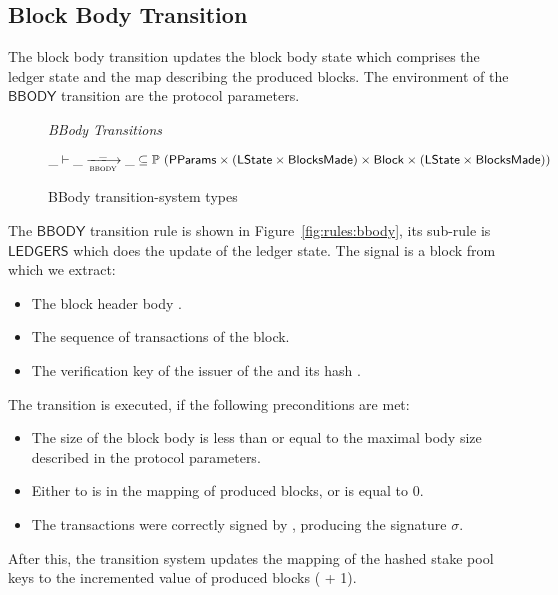 \subsection{Block Body Transition}
\label{sec:block-body-trans}

The block body transition updates the block body state which comprises the
ledger state and the map describing the produced blocks. The environment of the
$\mathsf{BBODY}$ transition are the protocol parameters.

\begin{figure}
  \emph{BBody Transitions}

  \begin{equation*}
    \_ \vdash \var{\_} \trans{bbody}{\_} \var{\_} \subseteq
    \powerset (\PParams \times (\LState\times\BlocksMade)
    \times \Block \times (\LState\times\BlocksMade))
  \end{equation*}
  \caption{BBody transition-system types}
  \label{fig:ts-types:bbody}
\end{figure}

The $\mathsf{BBODY}$ transition rule is shown in Figure~\ref{fig:rules:bbody},
its sub-rule is $\mathsf{LEDGERS}$ which does the update of the ledger
state. The signal is a block from which we extract:

\begin{itemize}
\item The block header body .
\item The sequence of transactions  of the block.
\item The verification key  of the issuer of the  and its
  hash .
\end{itemize}

The transition is executed, if the following preconditions are met:

\begin{itemize}
\item The size of the block body is less than or equal to the maximal body size
  described in the protocol parameters.
\item Either  to  is in the mapping of produced blocks, or
   is equal to 0.
\item The transactions  were correctly signed by , producing
  the signature $\sigma$.
\end{itemize}

After this, the transition system updates the mapping of the hashed stake pool
keys to the incremented value of produced blocks ( + 1).

